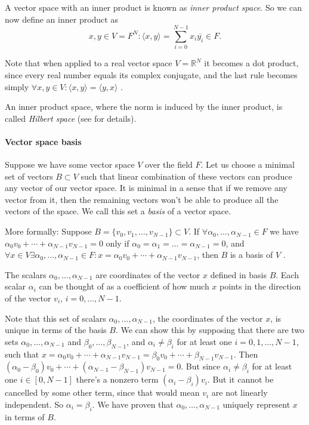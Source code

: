 \documentclass[10pt]{article}
\begin{document}
A vector space with an inner product is known as {\it inner product space}.
So we can now define an inner product as $$  x, y \in V=F^N:
\langle x, y \rangle = \sum_{i=0}^{N-1}x_i\overline{y_i} \in F.$$

Note that when applied to a real vector space $V = \mathbb{R}^N$ it becomes a
dot product, since every real number equals its complex conjugate, and the last
rule becomes simply $\forall x, y \in V: \langle x, y \rangle = \langle y, x
\rangle$ \cite{Axler1997}.

An inner product space, where the norm is induced by the inner product, is
called {\it Hilbert space} (see \cite{Teschl2010} for details).

\paragraph{Vector space basis} Suppose we have some vector space $V$ over the
field $F$. Let us choose a minimal set of vectors $B \subset V$ such that
linear combination of these vectors can produce any vector of our vector space.
It is minimal in a sense that if we remove any vector from it, then the
remaining vectors won't be able to produce all the vectors of the space. We call
this set a {\it basis} of a vector space.

More formally: Suppose $B=\{v_0, v_1, \ldots, v_{N-1}\} \subset V$. If $\forall
\alpha_0, \ldots, \alpha_{N-1} \in F$ we have $\alpha_0v_0 + \cdots +
\alpha_{N-1}v_{N-1} = 0$ only if $\alpha_0 = \alpha_1 = \ldots = \alpha_{N-1} =
0$, and $\forall x \in V \exists \alpha_0, \ldots, \alpha_{N-1} \in F: x =
\alpha_0v_0 + \cdots + \alpha_{N-1}v_{N-1}$, then $B$ is a basis of $V$
\cite{Matthews2010}.

The scalars $\alpha_0, \ldots, \alpha_{N-1}$ are coordinates of the vector $x$
defined in basis $B$. Each scalar $\alpha_i$ can be thought of as a coefficient
of how much $x$ points in the direction of the vector $v_i$, $i=0,\ldots,N-1$.

Note that this set of scalars $\alpha_0, \ldots, \alpha_{N-1}$, the coordinates of
the vector $x$, is unique in terms of the basis $B$. We can show this by
supposing that there are two sets $\alpha_0, \ldots, \alpha_{N-1}$ and
$\beta_0, \ldots, \beta_{N-1}$, and $\alpha_i \ne \beta_i$ for at least one
$i=0, 1, \ldots, N-1$, such that $x = \alpha_0v_0 + \cdots +
\alpha_{N-1}v_{N-1} = \beta_0v_0 + \cdots + \beta_{N-1}v_{N-1}$. Then
$(\alpha_0 - \beta_0)v_0 + \cdots + (\alpha_{N-1} - \beta_{N-1})v_{N-1}=0$. But
since  $\alpha_i \ne \beta_i$ for at least one $i \in [0, N-1]$ there's a
nonzero term $(\alpha_i-\beta_i)v_i$. But it cannot be cancelled by some other
term, since that would mean $v_i$ are not linearly independent. So $\alpha_i =
\beta_i$. We have proven that $\alpha_0, \ldots, \alpha_{N-1}$ uniquely
represent $x$ in terms of $B$.
\end{document}
